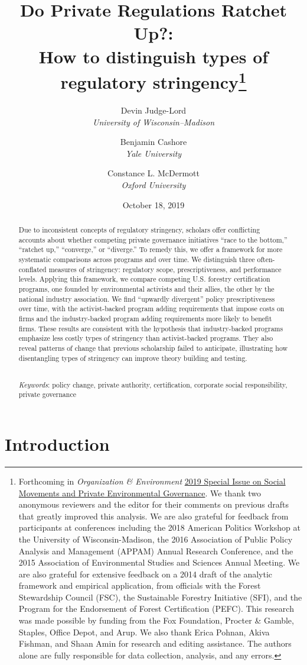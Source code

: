 \documentclass[
      12pt,
            Review ]{article}
\title{Do Private Regulations Ratchet Up?: 
           \\ How to distinguish types of regulatory stringency\thanks{Forthcoming in \emph{Organization \& Environment} \href{https://journals.sagepub.com/doi/full/10.1177/108602661985378}{2019 Special Issue on Social Movements and Private Environmental Governance}. We thank two anonymous reviewers and the editor for their comments on previous drafts that greatly improved this analysis. We are also grateful for feedback from participants at conferences including the 2018 American Politics Workshop at the University of Wisconsin-Madison, the 2016 Association of Public Policy Analysis and Management (APPAM) Annual Research Conference, and the 2015 Association of Environmental Studies and Sciences Annual Meeting. We are also grateful for extensive feedback on a 2014 draft of the analytic framework and empirical application, from officials with the Forest Stewardship Council (FSC), the Sustainable Forestry Initiative (SFI), and the Program for the Endorsement of Forest Certification (PEFC). This research was made possible by funding from the Fox Foundation, Procter \& Gamble, Staples, Office Depot, and Arup. We also thank Erica Pohnan, Akiva Fishman, and Shaan Amin for research and editing assistance. The authors alone are fully responsible for data collection, analysis, and any errors.}}
\author{ %
            Devin Judge-Lord  \\ \emph{University of Wisconsin--Madison} 
             \and 
            Benjamin Cashore  \\ \emph{Yale University} 
             \and 
            Constance L. McDermott  \\ \emph{Oxford University} 
            }
\date{October 18, 2019}
\begin{document}
 


  \maketitle




  \begin{abstract}
    \noindent Due to inconsistent concepts of regulatory stringency, scholars offer conflicting accounts about whether competing private governance initiatives ``race to the bottom,'' ``ratchet up,'' ``converge,'' or ``diverge.'' To remedy this, we offer a framework for more systematic comparisons across programs and over time. We distinguish three often-conflated measures of stringency: regulatory scope, prescriptiveness, and performance levels. Applying this framework, we compare competing U.S. forestry certification programs, one founded by environmental activists and their allies, the other by the national industry association. We find ``upwardly divergent'' policy prescriptiveness over time, with the activist-backed program adding requirements that impose costs on firms and the industry-backed program adding requirements more likely to benefit firms. These results are consistent with the hypothesis that industry-backed programs emphasize less costly types of stringency than activist-backed programs. They also reveal patterns of change that previous scholarship failed to anticipate, illustrating how disentangling types of stringency can improve theory building and testing. 

          \hfill \\ 
      \noindent \emph{Keywords}: policy change, private authority, certification, corporate social responsibility, private governance 
    
  \end{abstract}










\noindent 
      \doublespacing 
    \newpage

\hypertarget{introduction}{%
\section{Introduction}\label{introduction}}
\end{document}
